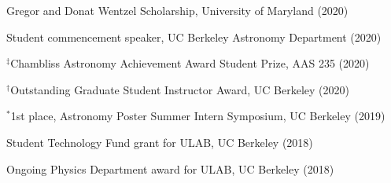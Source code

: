 \documentclass[12pt,letterpaper]{article}
\begin{document}
\begin{list}{}{\cvlist}

\item Gregor and Donat Wentzel Scholarship, University of Maryland (2020)
\item Student commencement speaker, UC Berkeley Astronomy Department (2020)
\item $^\ddagger$Chambliss Astronomy Achievement Award Student Prize, AAS 235 (2020)
\item $^\dagger$Outstanding Graduate Student Instructor Award, UC Berkeley (2020)
\item $^*$1st place, Astronomy Poster Summer Intern Symposium, UC Berkeley (2019)
\item Student Technology Fund grant for ULAB, UC Berkeley (2018)
\item Ongoing Physics Department award for ULAB, UC Berkeley (2018)

\end{list}
\end{document}
